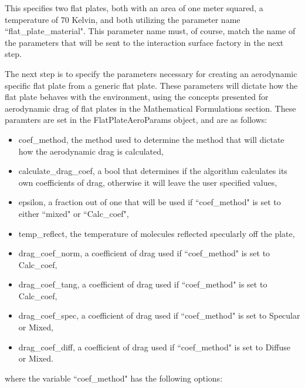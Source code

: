 This specifies two flat plates, both with an area of one meter squared,
a temperature of 70 Kelvin, and both utilizing the parameter name
``flat\_plate\_material". This parameter name must, of course, match
the name of the
parameters that will be sent to the interaction surface factory
in the next step.

The next step is to specify the parameters necessary for creating
an aerodynamic specific flat plate from a generic flat plate. These parameters
will dictate how the flat plate behaves with the environment, using the
concepts presented for aerodynamic drag of flat plates in the Mathematical
Formulations section. These paramters are set in the FlatPlateAeroParams object,
and are as follows:

\begin{itemize}
\item{coef\_method}, the method used to determine the method that will dictate
how the aerodynamic drag is calculated,
\item{calculate\_drag\_coef}, a bool that determines if the algorithm
calculates its own coefficients of drag, otherwise it will leave the
user specified values,
\item{epsilon}, a fraction out of one that will be used if ``coef\_method" is
set to either ``mixed" or ``Calc\_coef",
\item{temp\_reflect}, the temperature of molecules reflected specularly  off the plate,
\item{drag\_coef\_norm}, a coefficient of drag used if ``coef\_method" is
set to Calc\_coef,
\item{drag\_coef\_tang}, a coefficient of drag used if ``coef\_method" is
set to Calc\_coef,
\item{drag\_coef\_spec}, a coefficient of drag used if ``coef\_method" is
set to Specular or Mixed,
\item{drag\_coef\_diff}, a coefficient of drag used if ``coef\_method" is
set to Diffuse or Mixed.
\end{itemize}

where the variable ``coef\_method" has the following options:

